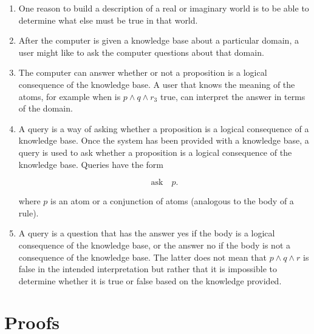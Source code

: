 \documentclass[12pt,a4paper, brazil]{article}
\begin{document}
\begin{enumerate}
  \item One reason to build a description of a real or imaginary world is to be able to determine what else must be true in that world. 

  \item After the computer is given a knowledge base about a particular domain, a user might like to ask the computer questions about that domain. 
  
  \item The computer can answer whether or not a proposition is a logical consequence of the knowledge base. A user that knows the meaning of the atoms, for example when is \( p \land q \land r_3 \) true, can interpret the answer in terms of the domain.
  
  \item A query is a way of asking whether a proposition is a logical consequence of a knowledge base. Once the system has been provided with a knowledge base, a query is used to ask whether a proposition is a logical consequence of the knowledge base. Queries have the form
  
  \[ \text{ask} \quad p. \]
  
  where \( p \) is an atom or a conjunction of atoms (analogous to the body of a rule).
  
  \item  A query is a question that has the answer yes if the body is a logical consequence of the knowledge base, or the answer no if the body is not a consequence of the knowledge base. The latter does not mean that \( p \land q \land r \) is false in the intended interpretation but rather that it is impossible to determine whether it is true or false based on the knowledge provided.
  
\end{enumerate}

\section{Proofs}
\end{document}
